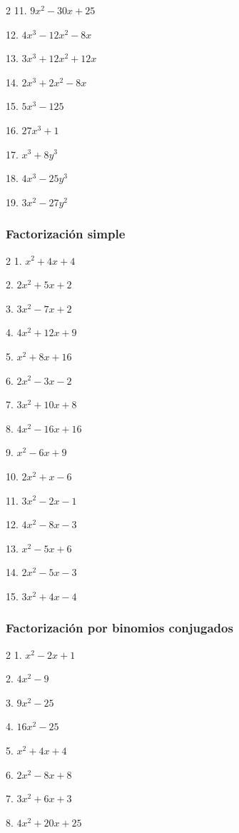 \documentclass[12pt]{article}
\begin{document}
{\begin{multicols}{2}
11. $9x^2 - 30x + 25$

12. $4x^3 - 12x^2 - 8x$


13. $3x^3 + 12x^2 + 12x$

14. $2x^3 + 2x^2 - 8x$

15. $5x^3 - 125$

16. $27x^3 + 1$

17. $x^3 + 8y^3$

18. $4x^3 - 25y^3$

19. $3x^2 - 27y^2$
\end{multicols}

\subsubsection{Factorización simple}\label{factorizaciuxf3n-simple}
\begin{multicols}{2}
1. $x^2 + 4x + 4$

2. $2x^2 + 5x + 2$

3. $3x^2 - 7x + 2$

4. $4x^2 + 12x + 9$

5. $x^2 + 8x + 16$

6. $2x^2 - 3x - 2$

7. $3x^2 + 10x + 8$

8. $4x^2 - 16x + 16$

9. $x^2 - 6x + 9$

10. $2x^2 + x - 6$

11. $3x^2 - 2x - 1$

12. $4x^2 - 8x - 3$

13. $x^2 - 5x + 6$

14. $2x^2 - 5x - 3$

15. $3x^2 + 4x - 4$
\end{multicols}

\subsubsection{Factorización por binomios conjugados}\label{factorizaciuxf3n-por-binomios-conjugados}
\begin{multicols}{2}
1. $x^2 - 2x + 1$

2. $4x^2 - 9$

3. $9x^2 - 25$

4. $16x^2 - 25$

5. $x^2 + 4x + 4$

6. $2x^2 - 8x + 8$

7. $3x^2 + 6x + 3$

8. $4x^2 + 20x + 25$


\end{multicols}}
\end{document}
